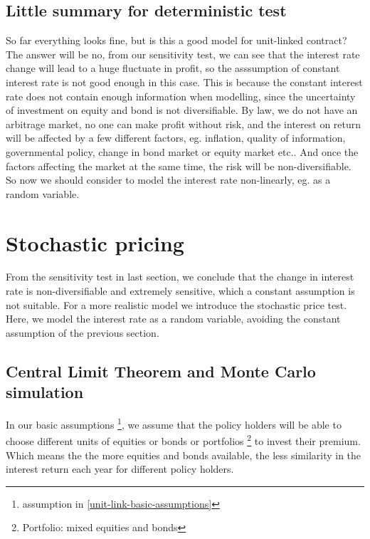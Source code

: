 \documentclass{report}
\begin{document}
\subsection{Little summary for deterministic test}
So far everything looks fine, but is this a good model for unit-linked contract? The answer will be no, from our sensitivity test, we can see that the interest rate change will lead to a huge fluctuate in profit, so the asssumption of constant interest rate is not good enough in this case. This is because the constant interest rate does not contain  enough information when modelling, since the uncertainty of investment on equity and bond is not diversifiable. By law, we do not have an arbitrage market, no one can make profit without risk, and the interest on return will be affected by a few different factors, \cite{bib:riskfactor} eg. inflation, quality of information, governmental policy, change in bond market or equity market etc.. And once the factors affecting the market at the same time, the risk will be non-diversifiable. So now we should consider to model the interest rate non-linearly, eg. as a random variable. 




\section{Stochastic pricing}

From the sensitivity test in last section, we conclude that the change in interest rate is non-diversifiable and extremely sensitive, which a constant assumption is not suitable. 
For a more realistic model we introduce the stochastic price test. Here, we model the interest rate as a random variable, avoiding the constant assumption of the previous section.


\subsection{Central Limit Theorem and Monte Carlo simulation}

In our basic assumptions \footnote{assumption in \ref{unit-link-basic-assumptions}}, we assume that the policy holders will be able to choose different units of equities or bonds or portfolios \footnote{Portfolio: mixed equities and bonds} to invest their premium. Which means the the more equities and bonds available, the less similarity in the interest return each year for different policy holders. 
\end{document}
